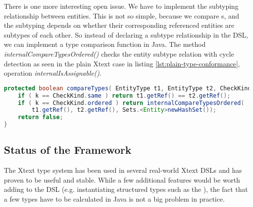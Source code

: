 There is one more interesting open issue. We have to implement the subtyping
relationship between entities. This is not so simple, because we compare
s, and the subtyping depends on whether their corresponding
referenced entities are subtypes of each other. So instead of declaring a
subtype relationship in the DSL, we can implement a type comparison function in
Java. The method \emph{internalCompareTypesOrdered()} checks the entity subtype
relation with cycle detection as seen in the plain Xtext case in listing
\ref{lst:plain-type-conformance}, operation \emph{internalIsAssignable()}.


\begin{lstlisting}[language=Java]
protected boolean compareTypes( EntityType t1, EntityType t2, CheckKind k, TypeCalculationTrace trace ) {
    if ( k == CheckKind.same ) return t1.getRef() == t2.getRef();
    if ( k == CheckKind.ordered ) return internalCompareTypesOrdered(
        t1.getRef(), t2.getRef(), Sets.<Entity>newHashSet());
    return false; 
}
\end{lstlisting}


\subsection{Status of the Framework}

The Xtext type system has been used in several real-world Xtext DSLs and has
proven to be useful and stable. While a few additional features would be worth
adding to the DSL (e.g. instantiating structured types such as the
), the fact that a few types have to be calculated in Java is not
a big problem in practice.
  
